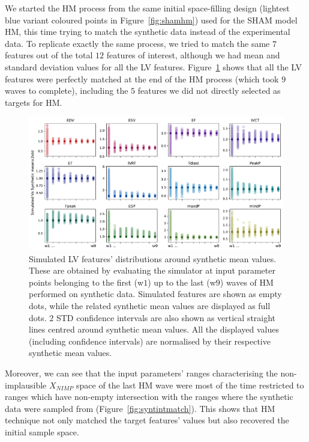 \vspace{0.2cm}
We started the HM process from the same initial space-filling design (lightest blue variant coloured points in Figure~\ref{fig:shamhm}) used for the SHAM model HM, this time trying to match the synthetic data instead of the experimental data. To replicate exactly the same process, we tried to match the same $7$ features out of the total $12$ features of interest, although we had mean and standard deviation values for all the LV features. Figure~\ref{fig:syntfeatmatch} shows that all the LV features were perfectly matched at the end of the HM process (which took $9$ waves to complete), including the $5$ features we did not directly selected as targets for HM.

\begin{figure}[ht!]
    \myfloatalign
    \includegraphics[width=1\textwidth]{figures/chapterA/hm_vs_synt_data_features.pdf}
    \caption{Simulated LV features’ distributions around synthetic mean values. These are obtained by evaluating the simulator at input parameter points belonging to the first (w$1$) up to the last (w$9$) waves of HM performed on synthetic data. Simulated features are shown as empty dots, while the related synthetic mean values are displayed as full dots. $2$ STD confidence intervals are also shown as vertical straight lines centred around synthetic mean values. All the displayed values (including confidence intervals) are normalised by their respective synthetic mean values.}
    \label{fig:syntfeatmatch}
\end{figure}

\vspace{0.2cm}\noindent
Moreover, we can see that the input parameters' ranges characterising the non-implausible $X_{NIMP}$ space of the last HM wave were most of the time restricted to ranges which have non-empty intersection with the ranges where the synthetic data were sampled from (Figure~\ref{fig:syntintmatch}). This shows that HM technique not only matched the target features' values but also recovered the initial sample space.

